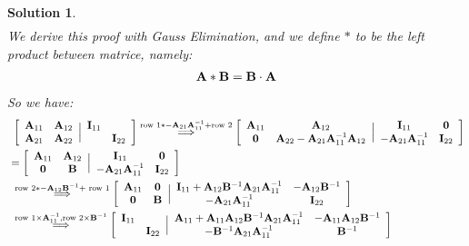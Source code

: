 \documentclass[11pt]{article}\usepackage[]{graphicx}\usepackage[]{color}
\newtheorem{sol}{Solution}
\begin{document}
\begin{sol}
\begin{align*}
	\end{align*}
	We derive this proof with Gauss Elimination, and we define $\ast$ to be the left product between matrice, namely:
	\begin{align*}
		{\bf A} \ast {\bf B} = {\bf B} \cdot {\bf A}
	\end{align*}
	So we have:
	\begin{align*}
	&\ 	\left[\begin{array}{cc} {\bf A}_{11}& {\bf A}_{12} \\{\bf A}_{21}  & {\bf A}_{22} \end{array}\Big\vert \begin{array}{cc} {\bf I}_{11}& \\ & {\bf I}_{22} \end{array} \right] \stackrel{\text{row }1 \ast -{\bf A}_{21}{\bf A}_{11}^{-1} + \text{row }2  }{\Longrightarrow}\left[\begin{array}{cc} {\bf A}_{11}& {\bf A}_{12}\\ {\bf 0}& {\bf A}_{22} - {\bf A}_{21}{\bf A}_{11}^{-1}{\bf A}_{12}\end{array}\Big\vert \begin{array}{cc} {\bf I}_{11}& {\bf 0}\\ -{\bf A}_{21}{\bf A}_{11}^{-1}& {\bf I}_{22}\end{array}\right]\\
	&= \left[\begin{array}{cc} {\bf A}_{11}& {\bf A}_{12}\\ {\bf 0}& {\bf B}\end{array}\Big\vert \begin{array}{cc} {\bf I}_{11}& {\bf 0}\\ -{\bf A}_{21}{\bf A}_{11}^{-1}& {\bf I}_{22}\end{array}\right]\\
	&\ \stackrel{\text{row } 2 \ast -{\bf A}_{12}{\bf B}^{-1} + \text{ row }1}{\Longrightarrow}\left[\begin{array}{cc} {\bf A}_{11}& {\bf 0}\\ {\bf 0}& {\bf B}\end{array}\Big\vert \begin{array}{cc} {\bf I}_{11} + {\bf A}_{12}{\bf B}^{-1}{\bf A}_{21}{\bf A}_{11}^{-1}& -{\bf A}_{12}{\bf B}^{-1}\\ -{\bf A}_{21}{\bf A}_{11}^{-1}& {\bf I}_{22}\end{array}\right]\\
	&\ \stackrel{\text{row } 1 \times {\bf A}_{11}^{-1}, \text{row }2 \times {\bf B}^{-1}}{\Longrightarrow}\left[\begin{array}{cc} {\bf I}_{11}& \\ & {\bf I}_{22}\end{array}\Big\vert \begin{array}{cc} {\bf A}_{11} + {\bf A}_{11}{\bf A}_{12}{\bf B}^{-1}{\bf A}_{21}{\bf A}_{11}^{-1}& -{\bf A}_{11}{\bf A}_{12}{\bf B}^{-1}\\ -{\bf B}^{-1}{\bf A}_{21}{\bf A}_{11}^{-1}& {\bf B}^{-1} \end{array}\right]

\end{align*}
\end{sol}
\end{document}
